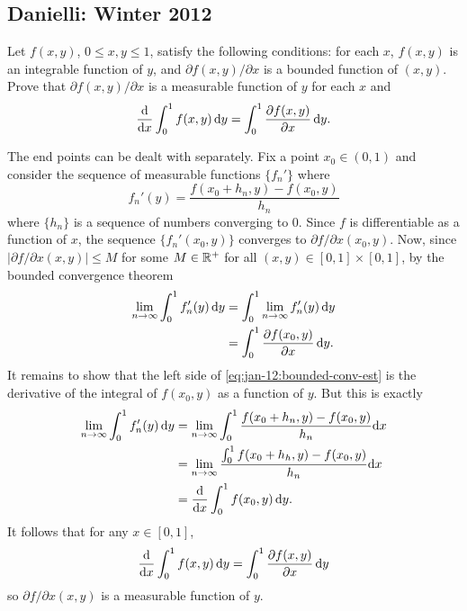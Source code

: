 \subsection{Danielli: Winter 2012}
\setcounter{exercise}{0}
\setcounter{equation}{0}

\begin{problem}
  Let \(f(x,y)\), \(0\leq x,y\leq 1\), satisfy the following conditions:
  for each \(x\), \(f(x,y)\) is an integrable function of \(y\), and
  \(\partial f(x,y)/\partial x\) is a bounded function of \((x,y)\). Prove
  that \(\partial f(x,y)/\partial x\) is a measurable function of \(y\) for
  each \(x\) and
  \[
    \frac{\mathrm{d}}{\mathrm{d} x}\int_0^1f(x,y)\mathop{}\!\mathrm{d} y= \int_0^1\frac{\partial
      f(x,y)}{\partial x}\mathop{}\!\mathrm{d} y.
  \]
\end{problem}
\begin{solution}
  The end points can be dealt with separately. Fix a point \(x_0\in(0,1)\)
  and consider the sequence of measurable functions \(\{f_n'\}\) where
  \[
    f_n'(y)=\frac{f(x_0+h_n,y)-f(x_0,y)}{h_n}
  \]
  where \(\{h_n\}\) is a sequence of numbers converging to \(0\). Since
  \(f\) is differentiable as a function of \(x\), the sequence
  \(\{f_n'(x_0,y)\}\) converges to \(\partial f/\partial x(x_0,y)\). Now,
  since \(|\partial f/\partial x(x,y)|\leq M\) for some \(M\in\mathbb{R}^+\) for
  all \((x,y)\in[0,1]\times[0,1]\), by the bounded convergence theorem
  \begin{gather}
    \label{eq:jan-12:bounded-conv-est}
    \begin{aligned}
      \lim_{n\to\infty}\int_0^1 f'_n(y)\mathop{}\!\mathrm{d} y
      &=\int_0^1\lim_{n\to\infty} f'_n(y)\mathop{}\!\mathrm{d} y\\
      &=\int_0^1 \frac{\partial f(x_0,y)}{\partial x}\mathop{}\!\mathrm{d} y.
    \end{aligned}
  \end{gather}
  It remains to show that the left side of
  \eqref{eq:jan-12:bounded-conv-est} is the derivative of the integral of
  \(f(x_0,y)\) as a function of \(y\). But this is exactly
  \begin{align*}
    \lim_{n\to\infty}\int_0^1 f'_n(y)\mathop{}\!\mathrm{d} y
    &=\lim_{n\to\infty}\int_0^1 \frac{f(x_0+h_n,y)-f(x_0,y)}{h_n}\mathrm{d} x\\
    &=\lim_{n\to\infty}\frac{\int_0^1 f(x_0+h_h,y)-f(x_0,y)}{h_n}\mathrm{d} x\\
    &=\frac{\mathrm{d}}{\mathrm{d} x}\int_0^1 f(x_0,y)\mathop{}\!\mathrm{d} y.
  \end{align*}
  It follows that for any \(x\in[0,1]\),
  \[
    \frac{\mathrm{d}}{\mathrm{d} x}\int_0^1f(x,y)\mathop{}\!\mathrm{d} y= \int_0^1\frac{\partial
      f(x,y)}{\partial x}\mathop{}\!\mathrm{d} y
  \]
  so \(\partial f/\partial x(x,y)\) is a measurable function of \(y\).
\end{solution}

